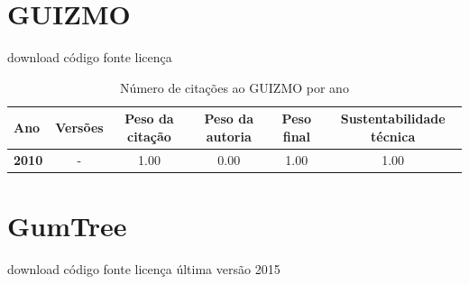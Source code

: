 \section{GUIZMO}
\checkmark download
\checkmark código fonte
\checkmark licença


\begin{table}[H]
\caption{Número de citações ao GUIZMO por ano}
\centering
\begin{tabular}{| l | c | c | c | c | c |}
  \hline
  Ano & Versões & Peso da citação & Peso da autoria & Peso final & Sustentabilidade técnica \\
  \hline
            {\bf 2010}
          &
          -
          &
          1.00
          &
          0.00
          &
          1.00
          &
            {\color{blue} 1.00}
          \\
\hline
\end{tabular}
\end{table}



\section{GumTree}
\checkmark download
\checkmark código fonte
\checkmark licença
\checkmark última versão 2015


